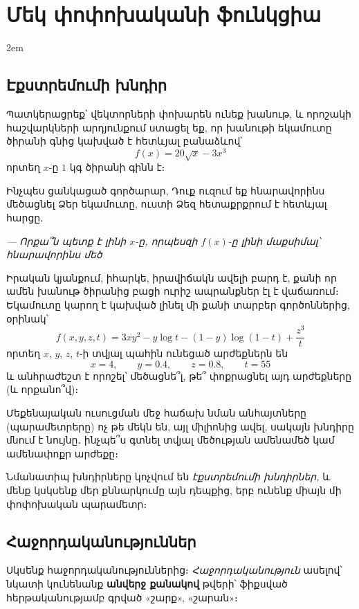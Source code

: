 \setchapterpreamble[u]{\margintoc}
\chapter{Մեկ փոփոխականի ֆունկցիա}

\emergencystretch 2em

\section{Էքստրեմումի խնդիր}\label{apricot}

Պատկերացրեք՝ վեկտորների փոխարեն ունեք խանութ, և որոշակի հաշվարկների արդյունքում ստացել եք, որ խանութի եկամուտը ծիրանի գնից կախված է հետևյալ բանաձևով՝
\[
f(x) = 20\sqrt{x}-3x^3
\]
որտեղ $x$-ը $1$ կգ ծիրանի գինն է։

Ինչպես ցանկացած գործարար, Դուք ուզում եք հնարավորինս մեծացնել Ձեր եկամուտը, ուստի Ձեզ հետաքրքրում է հետևյալ հարցը․

\textit{— Որքա՞ն պետք է լինի $x$-ը, որպեսզի $f(x)$-ը լինի մաքսիմալ՝ հնարավորինս մեծ}


Իրական կյանքում, իհարկե, իրավիճակն ավելի բարդ է, քանի որ ամեն խանութ ծիրանից բացի ուրիշ ապրանքներ էլ է վաճառում։ Եկամուտը կարող է կախված լինել մի քանի տարբեր գործոններից, օրինակ՝
\[
f(x,y,z,t) = 3xy^2-y\log t - (1-y) \log(1-t) + \frac{z^3}{t}
\]
որտեղ $x$, $y$, $z$, $t$-ի տվյալ պահին ունեցած արժեքներն են 
\[
x=4, \qquad y=0.4, \qquad z=0.8, \qquad t=55
\] 
և անհրաժեշտ է որոշել՝ մեծացնե՞լ, թե՞ փոքրացնել այդ արժեքները (և որքանո՞վ)։

Մեքենայական ուսուցման մեջ հաճախ նման անհայտները  (պարա\-մետ\-րերը) ոչ թե մեկն են, այլ միլիոնից ավել, սակայն խնդիրը մնում է նույնը․ ինչպե՞ս գտնել տվյալ մեծության ամենամեծ կամ ամենափոքր արժեքը։ 

Նմանատիպ խնդիրները կոչվում են \textit{էքստրեմումի խնդիրներ,} և մենք կսկսենք մեր քննարկումը այն դեպքից, երբ ունենք միայն մի փոփոխական պարամետր։


\section{Հաջորդականություններ}

Սկսենք հաջորդականություններից։ \textit{Հաջորդականություն} ասելով՝ նկա\-տի կունենանք \textbf{անվերջ քանակով} թվերի՝ ֆիքսված հերթականու\-թյամբ գրված «շարք», «շարան»։

